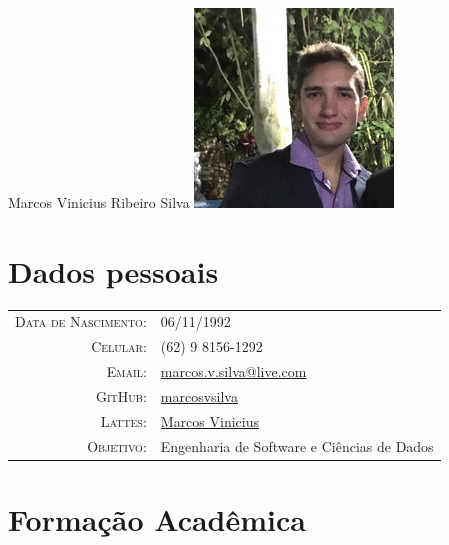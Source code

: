 \documentclass[12pt, oneside, openany, a4paper, english, brazil]{abntex2}
\begin{document}
\pagestyle{empty} 


\par{
	\raggedright{\Huge Marcos Vinicius Ribeiro Silva   }
	\raggedleft\includegraphics[scale=0.3]{Pictures/Me}
\par}

\section{Dados pessoais}

\begin{tabular}{rl}
	\textsc{Data de Nascimento:} & 06/11/1992\\
	\textsc{Celular:} & (62) 9 8156-1292\\
	\textsc{Email:} & \href{mailto:marcos.v.silva@live.com}{marcos.v.silva@live.com} \\
	\textsc{GitHub:} & \href{https://github.com/marcosvsilva}{marcosvsilva} \\
	\textsc{Lattes:} & \href{ http://lattes.cnpq.br/6930019751033452}{Marcos Vinicius} \\
	\textsc{Objetivo:} & Engenharia de Software e Ciências de Dados \\
\end{tabular}


\section{Formação Acadêmica}
\end{document}
